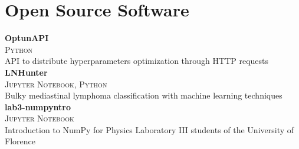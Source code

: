\newcommand{\pkgname}[1]
  {\normalsize \color{hlcolor-0} \textbf{#1}}

\newcommand{\pkginfo}[1]
  {\small \color{hlcolor-1} \textsc{#1}}
  
\newcommand{\pkgdesc}[1]
  {\normalsize \color{maincolor} {#1}}


\section*{Open Source Software}
\begin{cvcontent}
  \pkgname{OptunAPI} \hfill
  \\
  \pkginfo{Python}\\
  \pkgdesc{API to distribute hyperparameters optimization through HTTP requests}\\ [2.5mm]
  \pkgname{LNHunter} \hfill
  \\
  \pkginfo{Jupyter Notebook, Python}\\
  \pkgdesc{Bulky mediastinal lymphoma classification with machine learning techniques}\\ [2.5mm]
  \pkgname{lab3-numpyntro} \hfill
  \\
  \pkginfo{Jupyter Notebook}\\
  \pkgdesc{Introduction to NumPy for Physics Laboratory III students of the University of Florence}
\end{cvcontent}